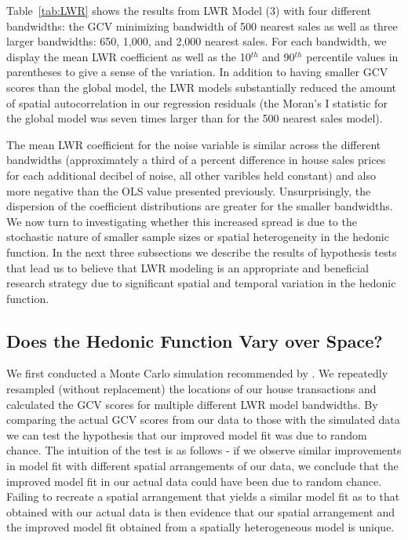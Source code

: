 \documentclass{article}\usepackage{graphicx, color}
\begin{document}
Table~\ref{tab:LWR} shows the results from LWR Model (3) with four different bandwidths: the GCV minimizing bandwidth of 500 nearest sales as well as three larger bandwidths: 650, 1,000, and 2,000 nearest sales. For each bandwidth, we display the mean LWR coefficient as well as the 10$^{th}$ and 90$^{th}$ percentile values in parentheses to give a sense of the variation. In addition to having smaller GCV scores than the global model, the LWR models substantially reduced the amount of spatial autocorrelation in our regression residuals (the Moran's I statistic for the global model was seven times larger than for the 500 nearest sales model). 

The mean LWR coefficient for the noise variable is similar across the different bandwidths (approximately a third of a percent difference in house sales prices for each additional decibel of noise, all other varibles held constant) and also more negative than the OLS value presented previously. Unsurprisingly, the dispersion of the coefficient distributions are greater for the smaller bandwidths. We now turn to investigating whether this increased spread is due to the stochastic nature of smaller sample sizes or spatial heterogeneity in the hedonic function. In the next three subsections we describe the results of hypothesis tests that lead us to believe that LWR modeling is an appropriate and beneficial research strategy due to significant spatial and temporal variation in the hedonic function. 

\subsection{Does the Hedonic Function Vary over Space?}

We first conducted a Monte Carlo simulation recommended by \citet{Fotheringham2002}. We repeatedly resampled (without replacement) the locations of our house transactions and calculated the GCV scores for multiple different LWR model bandwidths. By comparing the actual GCV scores from our data to those with the simulated data we can test the hypothesis that our improved model fit was due to random chance. The intuition of the test is as follows - if we observe similar improvements in model fit with different spatial arrangements of our data, we conclude that the improved model fit in our actual data could have been due to random chance. Failing to recreate a spatial arrangement that yields a similar model fit as to that obtained with our actual data is then evidence that our spatial arrangement and the improved model fit obtained from a spatially heterogeneous model is unique. 
\end{document}
